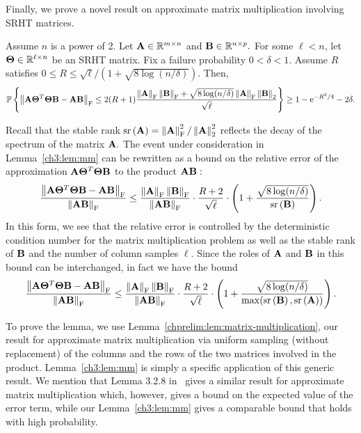 \noindent
Finally, we prove a novel result on approximate matrix multiplication 
involving SRHT matrices.

\begin{lemma}
\label{ch3:lem:mm}
Assume $n$ is a power of 2. Let $\mathbf{A} \in \mathbb{R}^{m \times n}$ and $\mathbf{B} \in \mathbb{R}^{n \times p}.$
For some $\ell < n$, let $\mathbf{\Theta} \in \mathbb{R}^{\ell \times n}$ be an SRHT 
matrix. Fix a failure probability $0 < \delta < 1.$ Assume $R$ 
satisfies
$
 0 \leq R \leq \sqrt{\ell}/(1+\sqrt{8\log(n/\delta)}).
$
Then,
\[
 \mathbb{P}\left\{ \left\|\mathbf{A} \mathbf{\Theta}^T \mathbf{\Theta} \mathbf{B} - \mathbf{A} \mathbf{B}\right\|_\mathrm{F}  \leq
  2 (R + 1) 
  \frac{\left\|\mathbf{A}\right\|_\mathrm{F}\left\|\mathbf{B}\right\|_\mathrm{F} + \sqrt{8 \log(n/\delta)}
        \left\|\mathbf{A}\right\|_\mathrm{F}\left\|\mathbf{B}\right\|_2}{\sqrt{\ell}} \right\} \geq 
  1 - \mathrm{e}^{-R^2/4} - 2\delta.
\]
\end{lemma}

\begin{remark}
  Recall that the stable rank 
  $\operatorname{sr}\left(\mathbf{A}\right) = \left\|\mathbf{A}\right\|_\mathrm{F}^2/\left\|\mathbf{A}\right\|_2^2$ reflects the decay of 
  the spectrum of the matrix $\mathbf{A}.$ The event under consideration in 
  Lemma~\ref{ch3:lem:mm} can be rewritten 
  as a bound on the relative error of the approximation 
  $\mathbf{A} \mathbf{\Theta}^T \mathbf{\Theta} \mathbf{B}$ to the product $\mathbf{A} \mathbf{B}:$
\[
\frac{\FNorm{\matA \matTh\transp \matTh \matB - \matA \matB}}%
     {\FNorm{\matA \matB}} \leq 
\frac{\FNorm{\matA}\FNorm{\matB}}{\FNorm{\matA\matB}} \cdot 
  \frac{R+2}{\sqrt{\ell}} \cdot 
  \left(1 + \frac{\sqrt{8 \log(n/\delta)}}{\stablerank{\matB}} \right).
\]
In this form, we see that the relative error is controlled by the 
deterministic condition number for the matrix multiplication problem as well 
as the stable rank of $\mathbf{B}$ and the number of column samples $\ell.$ Since 
the roles of $\mathbf{A}$ and $\mathbf{B}$ in this bound can be interchanged, in fact 
we have the bound
\[
\frac{\FNorm{\matA \matTh\transp \matTh \matB - \matA \matB}}%
     {\FNorm{\matA \matB}} \leq 
\frac{\FNorm{\matA}\FNorm{\matB}}{\FNorm{\matA\matB}} \cdot 
\frac{R+2}{\sqrt{\ell}} \cdot 
 \left(1 + \frac{\sqrt{8 \log(n/\delta)}}%
    {\max(\stablerank{\matB}, \stablerank{\matA})} \right).
\]
\end{remark}

To prove the lemma, we use Lemma~\ref{chprelim:lem:matrix-multiplication}, our result for
approximate matrix multiplication via uniform sampling (without replacement)
of the columns and the rows of the two matrices involved in the product.
Lemma~\ref{ch3:lem:mm} is simply a specific application of this generic result.
We mention that Lemma 3.2.8 in~\cite{Dri02} gives a
similar result for approximate matrix multiplication which, however, gives a 
bound on the expected value of the error term, while our Lemma~\ref{ch3:lem:mm}
gives a comparable bound that holds with high probability. 

